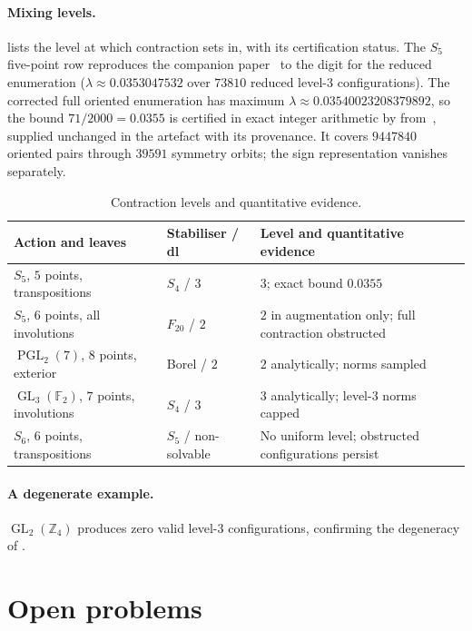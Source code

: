 \documentclass[11pt]{amsart}
\theoremstyle{definition}
\theoremstyle{remark}
\theoremstyle{plain}
\theoremstyle{plain}
\numberwithin{equation}{section}
\DeclareMathOperator{\GL}{GL}
\DeclareMathOperator{\PGL}{PGL}
\newcommand{\F}{\mathbb{F}}
\newcommand{\Z}{\mathbb{Z}}
\begin{document}
\paragraph{Mixing levels.}
 lists the level at which contraction sets in, with its certification
status. The $S_5$ five-point row reproduces the companion paper~\cite{ZermenoS5} to the digit
for the reduced enumeration ($\lambda\approx0.0353047532$ over $73810$ reduced
level-$3$ configurations). The corrected full oriented enumeration has maximum
$\lambda\approx0.03540023208379892$, so the bound $71/2000=0.0355$ is certified in exact integer arithmetic by
 from~\cite{ZermenoS5}, supplied unchanged in the artefact
with its provenance. It covers $9447840$ oriented pairs through $39591$ symmetry
orbits; the sign representation vanishes separately.

\begin{table}[t]
\centering\small
\begin{tabular}{p{}p{}p{}}
\toprule
Action and leaves & Stabiliser / dl & Level and quantitative evidence \\
\midrule
$S_5$, $5$ points, transpositions & $S_4$ / $3$ & $3$; exact bound $0.0355$~\cite{ZermenoS5} \\
$S_5$, $6$ points, all involutions & $F_{20}$ / $2$ & $2$ in augmentation only; full contraction obstructed \\
$\PGL_2(7)$, $8$ points, exterior & Borel / $2$ & $2$ analytically; norms sampled \\
$\GL_3(\F_2)$, $7$ points, involutions & $S_4$ / $3$ & $3$ analytically; level-$3$ norms capped \\
$S_6$, $6$ points, transpositions & $S_5$ / non-solvable & No uniform level; obstructed configurations persist \\
\bottomrule
\end{tabular}
\smallskip
\caption{Contraction levels and quantitative evidence.}
\label{tab:levels}
\end{table}

\paragraph{A degenerate example.}
$\GL_2(\Z_4)$ produces zero valid level-$3$ configurations,
confirming the degeneracy of .

\newpage
\section{Open problems}
\label{sec:open}
\end{document}
